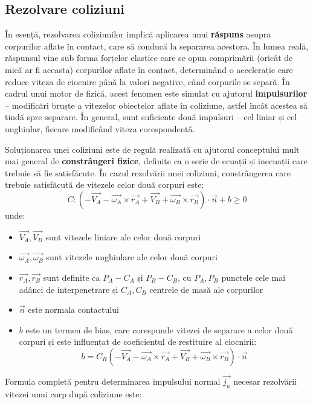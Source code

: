 \documentclass[12pt,a4paper]{report}
\begin{document}
\subsection{Rezolvare coliziuni}
În esență, rezolvarea coliziunilor implică aplicarea unui \textbf{răspuns} asupra corpurilor aflate în contact, care să conducă la separarea acestora. În lumea reală, răspunsul vine sub forma forțelor elastice care se opun comprimării (oricât de mică ar fi aceasta) corpurilor aflate în contact, determinând o accelerație care reduce viteza de ciocnire până la valori negative, când corpurile se separă. În cadrul unui motor de fizică, acest fenomen este simulat cu ajutorul \textbf{impulsurilor} -- modificări bruște a vitezelor obiectelor aflate în coliziune, astfel încât acestea să tindă spre separare. În general, sunt suficiente două impulsuri -- cel liniar și cel unghiular, fiecare modificând viteza corespondentă.

Soluționarea unei coliziuni este de regulă realizată cu ajutorul conceptului mult mai general de \textbf{constrângeri fizice}, definite ca o serie de ecuații și inecuații care trebuie să fie satisfăcute. În cazul rezolvării unei coliziuni, constrângerea care trebuie satisfăcută de vitezele celor două corpuri este:
$$ \dot{C} \colon \left( -\vec{V_A} - \vec{\omega_A} \times \vec{r_A} + \vec{V_B} + \vec{\omega_B} \times \vec{r_B} \right) \cdot \vec{n} + b\geq 0 $$unde:
\begin{itemize}
	\item $\vec{V_A}, \vec{V_B}$ sunt vitezele liniare ale celor două corpuri
	\item $\vec{\omega_A}, \vec{\omega_B}$ sunt vitezele unghiulare ale celor două corpuri
	\item $\vec{r_A}, \vec{r_B}$ sunt definite ca $P_A - C_A$ și $P_B - C_B$, cu $P_A,P_B$ punctele cele mai adânci de interpenetrare și $C_A, C_B$ centrele de masă ale corpurilor
	\item $\vec{n}$ este normala contactului
	\item $b$ este un termen de bias, care corespunde vitezei de separare a celor două corpuri și este influențat de coeficientul de restituire al ciocnirii: $$b = C_R\left( -\vec{V_A} - \vec{\omega_A} \times \vec{r_A} + \vec{V_B} + \vec{\omega_B} \times \vec{r_B} \right) \cdot \vec{n} $$
\end{itemize}

Formula completă pentru determinarea impulsului normal $\vec{j_n}$ necesar rezolvării vitezei unui corp după coliziune este:
\end{document}
